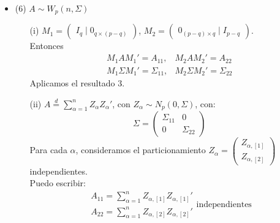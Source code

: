 \documentclass[11pt,a4paper]{article}
\begin{document}
\begin{itemize}
\begin{itemize}
\item (6) $A \sim W_{p}(n, \Sigma)$
\begin{itemize}
\item[(i)] $M_{1} = \begin{pmatrix} I_{q} \mid 0_{q \times (p-q)} \end{pmatrix}$, $M_{2} = \begin{pmatrix} 0_{(p-q) \times q} \mid I_{p-q} \end{pmatrix}$. \\
Entonces
$$\begin{matrix}
M_{1} A M_{1}' = A_{11}, & M_{2} A M_{2}' = A_{22} \\
M_{1} \Sigma M_{1}' = \Sigma_{11}, & M_{2} \Sigma M_{2}' = \Sigma_{22}
\end{matrix}$$
Aplicamos el resultado 3.
\item[(ii)] $A \overset{d}{=} \sum_{\alpha=1}^{n} Z_{\alpha}Z_{\alpha}'$, con $Z_{\alpha} \sim N_{p}(0, \Sigma)$, con:
$$\Sigma = \begin{pmatrix}
\Sigma_{11} & 0 \\
0 & \Sigma_{22}
\end{pmatrix}$$
Para cada $\alpha$, consideramos el particionamiento $Z_{\alpha} = \begin{pmatrix} Z_{\alpha, [1]} \\ Z_{\alpha, [2]} \end{pmatrix}$ independientes. \\
Puedo escribir:
$$\begin{aligned}
A_{11} = \sum_{\alpha=1}^{n} Z_{\alpha, [1]} Z_{\alpha, [1]}' \\
A_{22} = \sum_{\alpha=1}^{n} Z_{\alpha, [2]} Z_{\alpha, [2]}'
\end{aligned} \text{independientes}$$
\end{itemize}


\end{itemize}
\end{itemize}
\end{document}
